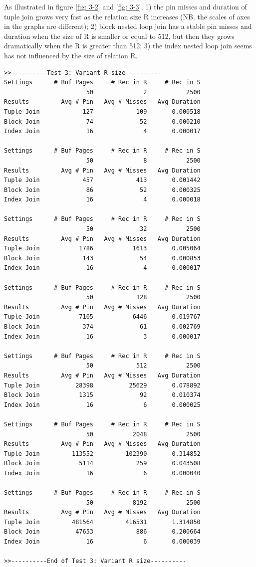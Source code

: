 \documentclass{article}
\begin{document}
As illustrated in figure \ref{fig: 3-2} and \ref{fig: 3-3}, 1) the pin misses and duration of tuple join grows very fast as the relation size R increases (NB. the scales of axes in the graphs are different); 2) block nested loop join has a stable pin misses and duration when the size of R is smaller or equal to 512, but then they grows dramatically when the R is greater than 512; 3) the index nested loop join seems has not influenced by the size of relation R.
\begin{verbatim}
>>----------Test 3: Variant R size----------
Settings      # Buf Pages     # Rec in R     # Rec in S
                       50              2           2500
Results         Avg # Pin   Avg # Misses   Avg Duration
Tuple Join            127            109       0.000518
Block Join             74             52       0.000210
Index Join             16              4       0.000017

Settings      # Buf Pages     # Rec in R     # Rec in S
                       50              8           2500
Results         Avg # Pin   Avg # Misses   Avg Duration
Tuple Join            457            413       0.001442
Block Join             86             52       0.000325
Index Join             16              4       0.000018

Settings      # Buf Pages     # Rec in R     # Rec in S
                       50             32           2500
Results         Avg # Pin   Avg # Misses   Avg Duration
Tuple Join           1786           1613       0.005064
Block Join            143             54       0.000853
Index Join             16              4       0.000017

Settings      # Buf Pages     # Rec in R     # Rec in S
                       50            128           2500
Results         Avg # Pin   Avg # Misses   Avg Duration
Tuple Join           7105           6446       0.019767
Block Join            374             61       0.002769
Index Join             16              3       0.000017

Settings      # Buf Pages     # Rec in R     # Rec in S
                       50            512           2500
Results         Avg # Pin   Avg # Misses   Avg Duration
Tuple Join          28398          25629       0.078892
Block Join           1315             92       0.010374
Index Join             16              6       0.000025

Settings      # Buf Pages     # Rec in R     # Rec in S
                       50           2048           2500
Results         Avg # Pin   Avg # Misses   Avg Duration
Tuple Join         113552         102390       0.314852
Block Join           5114            259       0.043508
Index Join             16              6       0.000040

Settings      # Buf Pages     # Rec in R     # Rec in S
                       50           8192           2500
Results         Avg # Pin   Avg # Misses   Avg Duration
Tuple Join         481564         416531       1.314850
Block Join          47653            886       0.200664
Index Join             16              6       0.000039

>>----------End of Test 3: Variant R size----------
\end{verbatim}
\end{document}
